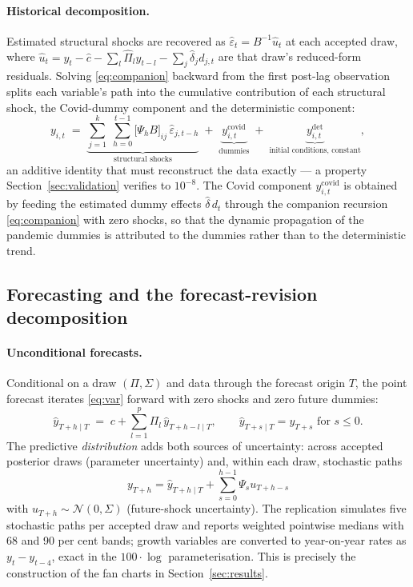 \paragraph{Historical decomposition.} Estimated structural shocks are recovered as $\hat{\varepsilon}_t = B^{-1}\hat{u}_t$ at each accepted draw, where $\hat{u}_t = y_t - \hat{c} - \sum_l \hat{\Pi}_l y_{t-l} - \sum_j \hat{\delta}_j d_{j,t}$ are that draw's reduced-form residuals. Solving \eqref{eq:companion} backward from the first post-lag observation splits each variable's path into the cumulative contribution of each structural shock, the Covid-dummy component and the deterministic component:
\begin{equation}
y_{i,t} \;=\; \underbrace{\sum_{j=1}^{k}\;\sum_{h=0}^{t-1}\big[\Psi_h B\big]_{ij}\,\hat{\varepsilon}_{j,t-h}}_{\text{structural shocks}}
\;+\; \underbrace{y^{\text{covid}}_{i,t}}_{\text{dummies}}
\;+\; \underbrace{y^{\text{det}}_{i,t}}_{\text{initial conditions, constant}},
\label{eq:hd}
\end{equation}
an additive identity that must reconstruct the data exactly --- a property Section~\ref{sec:validation} verifies to $10^{-8}$. The Covid component $y^{\text{covid}}_{i,t}$ is obtained by feeding the estimated dummy effects $\hat{\delta}\, d_t$ through the companion recursion \eqref{eq:companion} with zero shocks, so that the dynamic propagation of the pandemic dummies is attributed to the dummies rather than to the deterministic trend.

\subsection{Forecasting and the forecast-revision decomposition}
\label{sec:forecasting-math}

\paragraph{Unconditional forecasts.} Conditional on a draw $(\Pi, \Sigma)$ and data through the forecast origin $T$, the point forecast iterates \eqref{eq:var} forward with zero shocks and zero future dummies:
\begin{equation}
\hat{y}_{T+h \mid T} \;=\; c + \sum_{l=1}^{p} \Pi_l\, \hat{y}_{T+h-l \mid T},
\qquad \hat{y}_{T+s \mid T} = y_{T+s} \text{ for } s \le 0 .
\label{eq:pointfc}
\end{equation}
The predictive \emph{distribution} adds both sources of uncertainty: across accepted posterior draws (parameter uncertainty) and, within each draw, stochastic paths
\begin{equation*}
y_{T+h} = \hat{y}_{T+h\mid T} + \sum_{s=0}^{h-1}\Psi_s u_{T+h-s}
\end{equation*}
with $u_{T+h} \sim \mathcal{N}(0, \Sigma)$ (future-shock uncertainty). The replication simulates five stochastic paths per accepted draw and reports weighted pointwise medians with 68 and 90 per cent bands; growth variables are converted to year-on-year rates as $y_{t} - y_{t-4}$, exact in the $100\cdot\log$ parameterisation. This is precisely the construction of the fan charts in Section~\ref{sec:results}.

